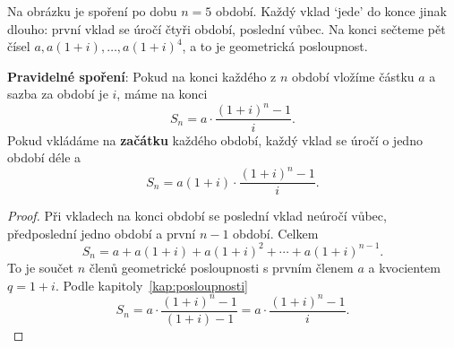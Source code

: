 \begin{center}
\end{center}
Na obrázku je spoření po dobu $n = 5$ období. Každý vklad `jede' do konce jinak dlouho: první vklad se úročí čtyři období, poslední vůbec. Na konci sečteme pět čísel $a, a(1 + i), \ldots, a{(1 + i)}^4$, a to je geometrická posloupnost.

\begin{definitionbox}
  \textbf{Pravidelné spoření}: Pokud na konci každého z $n$ období vložíme částku $a$ a sazba za období je $i$, máme na konci
  \begin{equation*}
    S_n = a\cdot\frac{{(1 + i)}^n - 1}{i}.
  \end{equation*}
  Pokud vkládáme na \textbf{začátku} každého období, každý vklad se úročí o jedno období déle a
  \begin{equation*}
    S_n = a{(1 + i)}\cdot\frac{{(1 + i)}^n - 1}{i}.
  \end{equation*}
\end{definitionbox}

\begin{proof}
  Při vkladech na konci období se poslední vklad neúročí vůbec, předposlední jedno období a první $n - 1$ období. Celkem
  \begin{equation*}
    S_n = a + a(1 + i) + a{(1 + i)}^2 + \cdots + a{(1 + i)}^{n-1}.
  \end{equation*}
  To je součet $n$ členů geometrické posloupnosti s prvním členem $a$ a kvocientem $q = 1 + i$. Podle kapitoly~\ref{kap:posloupnosti}
  \begin{equation*}
    S_n = a\cdot\frac{{(1 + i)}^n - 1}{(1 + i) - 1} = a\cdot\frac{{(1 + i)}^n - 1}{i}.
  \end{equation*}
\end{proof}

